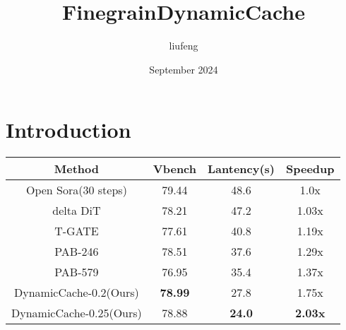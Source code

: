 \documentclass{article}
\title{FinegrainDynamicCache}
\author{liufeng }
\date{September 2024}
\begin{document}
\maketitle

\section{Introduction}

  


\begin{table}[]
\begin{tabular}{cccc}
\toprule
Method              & Vbench         & Lantency(s) & Speedup        \\
\midrule
Open Sora(30 steps) & 79.44          & 48.6        & 1.0x           \\
\midrule
delta DiT           & 78.21          & 47.2        & 1.03x          \\
T-GATE              & 77.61          & 40.8        & 1.19x          \\
PAB-246             & 78.51          & 37.6        & 1.29x          \\
PAB-579             & 76.95          & 35.4        & 1.37x          \\
\midrule
DynamicCache-0.2(Ours)     & \textbf{78.99} & 27.8        & 1.75x          \\
DynamicCache-0.25(Ours)    & 78.88          & \textbf{24.0}        & \textbf{2.03x} \\
\bottomrule
\end{tabular}
\end{table}
\end{document}

